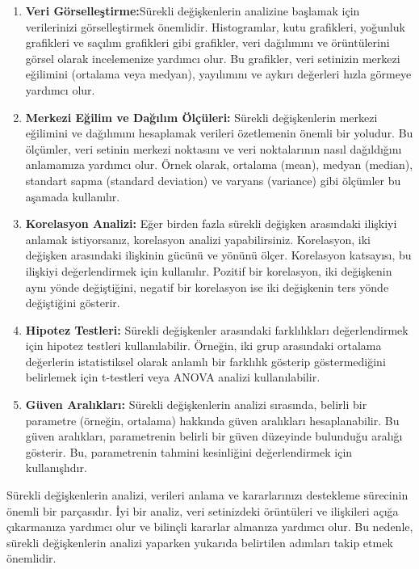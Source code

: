 \documentclass[
  letterpaper,
  DIV=11,
  numbers=noendperiod]{scrreprt}
\begin{document}
\begin{enumerate}
\def\labelenumi{\arabic{enumi}.}
\item
  \textbf{Veri Görselleştirme:}Sürekli değişkenlerin analizine başlamak
  için verilerinizi görselleştirmek önemlidir. Histogramlar, kutu
  grafikleri, yoğunluk grafikleri ve saçılım grafikleri gibi grafikler,
  veri dağılımını ve örüntülerini görsel olarak incelemenize yardımcı
  olur. Bu grafikler, veri setinizin merkezi eğilimini (ortalama veya
  medyan), yayılımını ve aykırı değerleri hızla görmeye yardımcı olur.
\item
  \textbf{Merkezi Eğilim ve Dağılım Ölçüleri:} Sürekli değişkenlerin
  merkezi eğilimini ve dağılımını hesaplamak verileri özetlemenin önemli
  bir yoludur. Bu ölçümler, veri setinin merkezi noktasını ve veri
  noktalarının nasıl dağıldığını anlamamıza yardımcı olur. Örnek olarak,
  ortalama (mean), medyan (median), standart sapma (standard deviation)
  ve varyans (variance) gibi ölçümler bu aşamada kullanılır.
\item
  \textbf{Korelasyon Analizi:} Eğer birden fazla sürekli değişken
  arasındaki ilişkiyi anlamak istiyorsanız, korelasyon analizi
  yapabilirsiniz. Korelasyon, iki değişken arasındaki ilişkinin gücünü
  ve yönünü ölçer. Korelasyon katsayısı, bu ilişkiyi değerlendirmek için
  kullanılır. Pozitif bir korelasyon, iki değişkenin aynı yönde
  değiştiğini, negatif bir korelasyon ise iki değişkenin ters yönde
  değiştiğini gösterir.
\item
  \textbf{Hipotez Testleri:} Sürekli değişkenler arasındaki
  farklılıkları değerlendirmek için hipotez testleri kullanılabilir.
  Örneğin, iki grup arasındaki ortalama değerlerin istatistiksel olarak
  anlamlı bir farklılık gösterip göstermediğini belirlemek için
  t-testleri veya ANOVA analizi kullanılabilir.
\item
  \textbf{Güven Aralıkları:} Sürekli değişkenlerin analizi sırasında,
  belirli bir parametre (örneğin, ortalama) hakkında güven aralıkları
  hesaplanabilir. Bu güven aralıkları, parametrenin belirli bir güven
  düzeyinde bulunduğu aralığı gösterir. Bu, parametrenin tahmini
  kesinliğini değerlendirmek için kullanışlıdır.
\end{enumerate}

Sürekli değişkenlerin analizi, verileri anlama ve kararlarınızı
destekleme sürecinin önemli bir parçasıdır. İyi bir analiz, veri
setinizdeki örüntüleri ve ilişkileri açığa çıkarmanıza yardımcı olur ve
bilinçli kararlar almanıza yardımcı olur. Bu nedenle, sürekli
değişkenlerin analizi yaparken yukarıda belirtilen adımları takip etmek
önemlidir.
\end{document}
